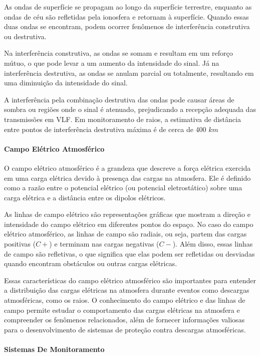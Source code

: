 \documentclass[a4paper, 12pt, onecolumn,singlespacing]{article}
\begin{document}
		As ondas de superfície se propagam ao longo da superfície terrestre, enquanto as ondas de céu são refletidas pela ionosfera e retornam à superfície. Quando essas duas ondas se encontram, podem ocorrer fenômenos de interferência construtiva ou destrutiva.
		
		Na interferência construtiva, as ondas se somam e resultam em um reforço mútuo, o que pode levar a um aumento da intensidade do sinal. Já na interferência destrutiva, as ondas se anulam parcial ou totalmente, resultando em uma diminuição da intensidade do sinal.
		
		A interferência pela combinação destrutiva das ondas pode causar áreas de sombra ou regiões onde o sinal é atenuado, prejudicando a recepção adequada das transmissões em VLF. Em monitoramento de raios, a estimativa de distância entre pontos de interferência destrutiva máxima é de cerca de 400 $km$
	
	\paragraph{Campo Elétrico Atmosférico}
	
	O campo elétrico atmosférico é a grandeza que descreve a força elétrica exercida em uma carga elétrica devido à presença das cargas na atmosfera. Ele é definido como a razão entre o potencial elétrico (ou potencial eletrostático) sobre uma carga elétrica e a distância entre os dipolos elétricos.
	
	As linhas de campo elétrico são representações gráficas que mostram a direção e intensidade do campo elétrico em diferentes pontos do espaço. No caso do campo elétrico atmosférico, as linhas de campo são radiais, ou seja, partem das cargas positivas ($C+$) e terminam nas cargas negativas ($C-$). Além disso, essas linhas de campo são refletivas, o que significa que elas podem ser refletidas ou desviadas quando encontram obstáculos ou outras cargas elétricas.
	
	Essas características do campo elétrico atmosférico são importantes para entender a distribuição das cargas elétricas na atmosfera durante eventos como descargas atmosféricas, como os raios. O conhecimento do campo elétrico e das linhas de campo permite estudar o comportamento das cargas elétricas na atmosfera e compreender os fenômenos relacionados, além de fornecer informações valiosas para o desenvolvimento de sistemas de proteção contra descargas atmosféricas.
	
	\paragraph{Sistemas De Monitoramento}
	
\end{document}
